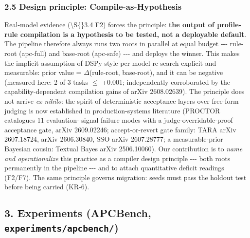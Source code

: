 \subsubsection{2.5 Design principle: Compile-as-Hypothesis}\label{25-design-principle-compile-as-hypothesis}

Real-model evidence (\textbackslash S\{\}3.4 F2) forces the principle: \textbf{the output of profile-rule compilation is a hypothesis to be tested, not a deployable default}. The pipeline therefore always runs two roots in parallel at equal budget -\/-\/- rule-root (apc-full) and base-root (apc-safe) -\/-\/- and deploys the winner. This makes the implicit assumption of DSPy-style per-model re-search explicit and measurable: prior value = \(\Delta\)(rule-root, base-root), and it can be negative (measured here: 2 of 3 tasks \(\leq\) +0.001; independently corroborated by the capability-dependent compilation gains of arXiv 2608.02639). The principle does not arrive \emph{ex nihilo}: the spirit of deterministic acceptance layers over free-form judging is now established in production-systems literature (PROCTOR catalogues 11 evaluation- signal failure modes with a judge-overridable-proof acceptance gate, arXiv 2609.02246; accept-or-revert gate family: TARA arXiv 2607.18724, arXiv 2606.30840, SSO arXiv 2607.28777; a measurable-prior Bayesian cousin: Textual Bayes arXiv 2506.10060). Our contribution is to \emph{name and operationalize} this practice as a compiler design principle -\/-\/- both roots permanently in the pipeline -\/-\/- and to attach quantitative deficit readings (F2/F7). The same principle governs migration: seeds must pass the holdout test before being carried (KR-6).

\subsection{\texorpdfstring{3. Experiments (APCBench, \texttt{experiments/apcbench/})}{3. Experiments (APCBench, experiments/apcbench/)}}\label{3-experiments-apcbench-experimentsapcbench}

